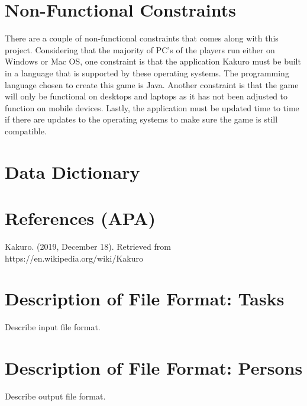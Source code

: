 \documentclass[12pt]{article}
\begin{document}
\clearpage

\section{Non-Functional Constraints}
There are a couple of non-functional constraints that comes along with this project. Considering that the majority of PC’s of the players run either on Windows or Mac OS, one constraint is that the application Kakuro must be built in a language that is supported by these operating systems. The programming language chosen to create this game is Java. Another constraint is that the game will only be functional on desktops and laptops as it has not been adjusted to function on mobile devices. Lastly, the application must be updated time to time if there are updates to the operating systems to make sure the game is still compatible.\\

\clearpage

\section{Data Dictionary}

\clearpage

\section{References (APA)}

Kakuro. (2019, December 18). Retrieved from https://en.wikipedia.org/wiki/Kakuro
\clearpage
\appendix

\section{Description of File Format: Tasks}

Describe input file format.

\section{Description of File Format: Persons}

Describe output file format.
\end{document}
